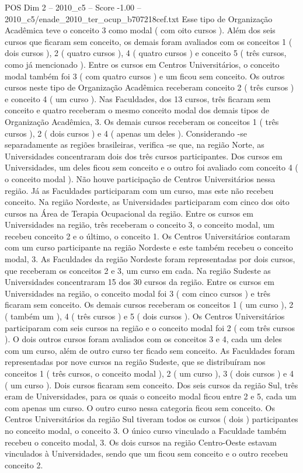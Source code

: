 \begin{textsample}{POS Dim 2 – 2010\_c5 – Score -1.00 – 2010\_c5/enade\_2010\_ter\_ocup\_b707218cef.txt}
Esse tipo de Organização Acadêmica teve o conceito 3 como modal ( com oito cursos ).
Além dos seis cursos que ficaram sem conceito, os demais foram avaliados com os conceitos 1 ( dois cursos ), 2 ( quatro cursos ), 4 ( quatro cursos ) e conceito 5 ( três cursos, como já mencionado ).
Entre os cursos em Centros Universitários, o conceito modal também foi 3 ( com quatro cursos ) e um ficou sem conceito.
Os outros cursos neste tipo de Organização Acadêmica receberam conceito 2 ( três cursos ) e conceito 4 ( um curso ).
Nas Faculdades, dos 13 cursos, três ficaram sem conceito e quatro receberam o mesmo conceito modal dos demais tipos de Organização Acadêmica, 3.
Os demais cursos receberam os conceitos 1 ( três cursos ), 2 ( dois cursos ) e 4 ( apenas um deles ).
Considerando -se separadamente as regiões brasileiras, verifica -se que, na região Norte, as Universidades concentraram dois dos três cursos participantes.
Dos cursos em Universidades, um deles ficou sem conceito e o outro foi avaliado com conceito 4 ( o conceito modal ).
Não houve participação de Centros Universitários nessa região.
Já as Faculdades participaram com um curso, mas este não recebeu conceito.
Na região Nordeste, as Universidades participaram com cinco dos oito cursos na Área de Terapia Ocupacional da região.
Entre os cursos em Universidades na região, três receberam o conceito 3, o conceito modal, um recebeu conceito 2 e o último, o conceito 1.
Os Centros Universitários contaram com um curso participante na região Nordeste e este também recebeu o conceito modal, 3.
As Faculdades da região Nordeste foram representadas por dois cursos, que receberam os conceitos 2 e 3, um curso em cada.
Na região Sudeste as Universidades concentraram 15 dos 30 cursos da região.
Entre os cursos em Universidades na região, o conceito modal foi 3 ( com cinco cursos ) e três ficaram sem conceito.
Os demais cursos receberam os conceitos 1 ( um curso ), 2 ( também um ), 4 ( três cursos ) e 5 ( dois cursos ).
Os Centros Universitários participaram com seis cursos na região e o conceito modal foi 2 ( com três cursos ).
O dois outros cursos foram avaliados com os conceitos 3 e 4, cada um deles com um curso, além de outro curso ter ficado sem conceito.
As Faculdades foram representadas por nove cursos na região Sudeste, que se distribuíram nos conceitos 1 ( três cursos, o conceito modal ), 2 ( um curso ), 3 ( dois cursos ) e 4 ( um curso ).
Dois cursos ficaram sem conceito.
Dos seis cursos da região Sul, três eram de Universidades, para os quais o conceito modal ficou entre 2 e 5, cada um com apenas um curso.
O outro curso nessa categoria ficou sem conceito.
Os Centros Universitários da região Sul tiveram todos os cursos ( dois ) participantes no conceito modal, o conceito 3.
O único curso vinculado a Faculdade também recebeu o conceito modal, 3.
Os dois cursos na região Centro-Oeste estavam vinculados à Universidades, sendo que um ficou sem conceito e o outro recebeu conceito 2.

\end{textsample}
